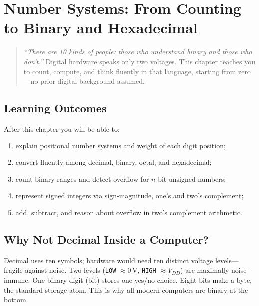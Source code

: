 \chapter{Number Systems: From Counting to Binary and Hexadecimal}
\label{ch:numbers}

\begin{quote}
\emph{``There are 10 kinds of people: those who understand binary and those who don't.''}
Digital hardware speaks only two voltages. This chapter teaches you to count, compute, and
think fluently in that language, starting from zero---no prior digital background assumed.
\end{quote}

\noindent{}
\vspace{0.4em}

\section*{Learning Outcomes}
After this chapter you will be able to:
\begin{enumerate}[label=(L\arabic*)]
    \item explain positional number systems and weight of each digit position;
    \item convert fluently among decimal, binary, octal, and hexadecimal;
    \item count binary ranges and detect overflow for $n$-bit unsigned numbers;
    \item represent signed integers via sign-magnitude, one's and two's complement;
    \item add, subtract, and reason about overflow in two's complement arithmetic.
\end{enumerate}

\section{Why Not Decimal Inside a Computer?}
\label{sec:why-binary}
Decimal uses ten symbols; hardware would need ten distinct voltage levels---fragile
against noise. Two levels (\texttt{LOW} $\approx 0$\,V, \texttt{HIGH} $\approx V_{DD}$)
are maximally noise-immune. One binary digit (bit) stores one yes/no choice. Eight bits make a byte,
the standard storage atom. This is why all modern computers are binary at the bottom.

